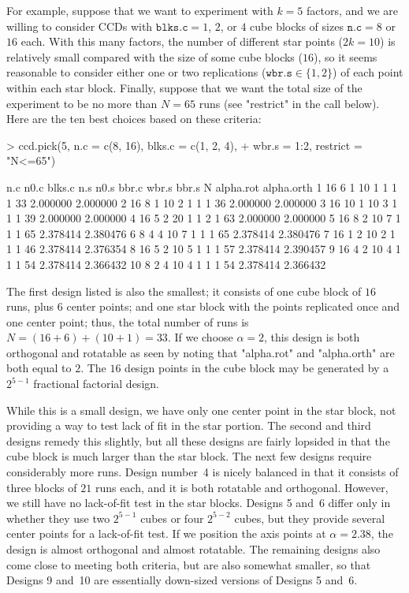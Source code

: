 \documentclass[article,nojss]{jss}
\begin{document}
For example, suppose that we want to experiment with $k=5$ factors, and we are willing to consider CCDs with $\mathtt{blks.c}=1$, $2$, or $4$ cube blocks of sizes $\mathtt{n.c}=8$ or $16$ each.  
With this many factors, the number of different star points ($2k=10$) is relatively small compared with the size of some cube blocks ($16$), so it seems reasonable to consider either one or two replications ($\mathtt{wbr.s}\in\{1,2\}$) of each point within each star block.  
Finally, suppose that we want the total size of the experiment to be no more than $N=65$ runs (see "restrict" in the call below).  Here are the ten best choices based on these criteria:
\begin{Schunk}
\begin{Sinput}
> ccd.pick(5, n.c = c(8, 16), blks.c = c(1, 2, 4),
+   wbr.s = 1:2, restrict = "N<=65")
\end{Sinput}
\begin{Soutput}
   n.c n0.c blks.c n.s n0.s bbr.c wbr.s bbr.s  N alpha.rot alpha.orth
1   16    6      1  10    1     1     1     1 33  2.000000   2.000000
2   16    8      1  10    2     1     1     1 36  2.000000   2.000000
3   16   10      1  10    3     1     1     1 39  2.000000   2.000000
4   16    5      2  20    1     1     2     1 63  2.000000   2.000000
5   16    8      2  10    7     1     1     1 65  2.378414   2.380476
6    8    4      4  10    7     1     1     1 65  2.378414   2.380476
7   16    1      2  10    2     1     1     1 46  2.378414   2.376354
8   16    5      2  10    5     1     1     1 57  2.378414   2.390457
9   16    4      2  10    4     1     1     1 54  2.378414   2.366432
10   8    2      4  10    4     1     1     1 54  2.378414   2.366432
\end{Soutput}
\end{Schunk}
The first design listed is also the smallest; it consists of one cube block of $16$ runs, plus $6$ center points; and one star block with the points replicated once and one center point; thus, the total number of runs is $N=(16+6)+(10+1) = 33$.
If we choose $\alpha=2$, this design is both orthogonal and rotatable as seen by noting that "alpha.rot" and "alpha.orth" are both equal to $2$.  The $16$ design points in the cube block may be generated by a $2^{5-1}$ fractional factorial design.

While this is a small design, we have only one center point in the star block, not providing a way to test lack of fit in the star portion.  The second and third designs remedy this slightly, but all these designs are fairly lopsided in that the cube block is much larger than the star block.  The next few designs require considerably more runs.  Design number~4 is nicely balanced in that it consists of three blocks of $21$ runs each, and it is both rotatable and orthogonal.  However, we still have no lack-of-fit test in the star blocks.  Designs 5 and~6 differ only in whether they use two $2^{5-1}$ cubes or four $2^{5-2}$ cubes, but they provide several center points for a lack-of-fit test.  If we position the axis points at $\alpha=2.38$, the design is almost orthogonal and almost rotatable.  The remaining designs also come close to meeting both criteria, but are also somewhat smaller, so that Designs 9 and~10 are essentially down-sized versions of Designs 5 and~6.
\end{document}
